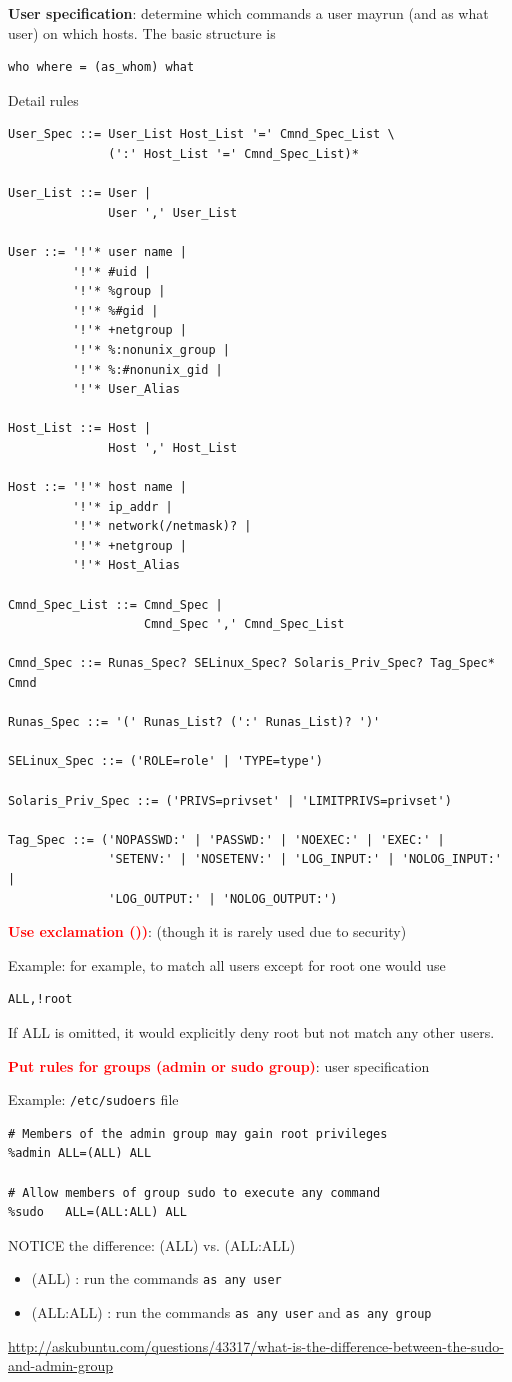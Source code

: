 {\bf User specification}: determine which commands a user mayrun (and as what
user) on which hosts. The basic structure is
\begin{verbatim}
who where = (as_whom) what
\end{verbatim}
Detail rules
\begin{verbatim}
User_Spec ::= User_List Host_List '=' Cmnd_Spec_List \
              (':' Host_List '=' Cmnd_Spec_List)*

User_List ::= User |
              User ',' User_List
 
User ::= '!'* user name |
         '!'* #uid |
         '!'* %group |
         '!'* %#gid |
         '!'* +netgroup |
         '!'* %:nonunix_group |
         '!'* %:#nonunix_gid |
         '!'* User_Alias

Host_List ::= Host |
              Host ',' Host_List
 
Host ::= '!'* host name |
         '!'* ip_addr |
         '!'* network(/netmask)? |
         '!'* +netgroup |
         '!'* Host_Alias
                   
Cmnd_Spec_List ::= Cmnd_Spec |
                   Cmnd_Spec ',' Cmnd_Spec_List
 
Cmnd_Spec ::= Runas_Spec? SELinux_Spec? Solaris_Priv_Spec? Tag_Spec* Cmnd
 
Runas_Spec ::= '(' Runas_List? (':' Runas_List)? ')'
 
SELinux_Spec ::= ('ROLE=role' | 'TYPE=type')
 
Solaris_Priv_Spec ::= ('PRIVS=privset' | 'LIMITPRIVS=privset')
 
Tag_Spec ::= ('NOPASSWD:' | 'PASSWD:' | 'NOEXEC:' | 'EXEC:' |
              'SETENV:' | 'NOSETENV:' | 'LOG_INPUT:' | 'NOLOG_INPUT:' |
              'LOG_OUTPUT:' | 'NOLOG_OUTPUT:')
\end{verbatim}


\textcolor{red}{\bf Use exclamation (\!))}: (though it is rarely used due to
security) 

Example: for example, to match all users except for root one would use
\begin{verbatim}
ALL,!root
\end{verbatim}
If ALL is omitted, it would explicitly deny root but not match any other users. 

\textcolor{red}{\bf Put rules for groups (admin or sudo group)}: user
specification 

Example: \verb!/etc/sudoers! file
\begin{verbatim}
# Members of the admin group may gain root privileges
%admin ALL=(ALL) ALL

# Allow members of group sudo to execute any command
%sudo   ALL=(ALL:ALL) ALL
\end{verbatim}
NOTICE the difference: (ALL) vs. (ALL:ALL)
\begin{itemize}
  \item (ALL) : run the commands \verb!as any user!
  \item (ALL:ALL) : run the commands \verb!as any user! and \verb!as any group!
\end{itemize}
\url{http://askubuntu.com/questions/43317/what-is-the-difference-between-the-sudo-and-admin-group}


